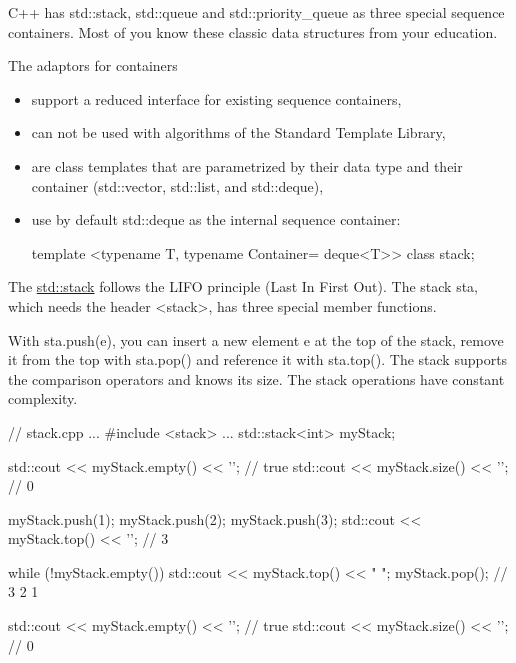 C++ has std::stack, std::queue and std::priority\_queue as three special sequence containers. Most of you know these classic data structures from your education.

The adaptors for containers

\begin{itemize}
\item 
support a reduced interface for existing sequence containers,

\item 
can not be used with algorithms of the Standard Template Library,

\item 
are class templates that are parametrized by their data type and their container (std::vector, std::list, and std::deque),

\item 
use by default std::deque as the internal sequence container:

\begin{cpp}
template <typename T, typename Container= deque<T>>
class stack;
\end{cpp}
\end{itemize}



The \href{http://en.cppreference.com/w/cpp/container/stack}{std::stack} follows the LIFO principle (Last In First Out). The stack sta, which needs the header <stack>, has three special member functions.

With sta.push(e), you can insert a new element e at the top of the stack, remove it from the top with sta.pop() and reference it with sta.top(). The stack supports the comparison operators and knows its size. The stack operations have constant complexity.


\begin{cpp}
// stack.cpp
...
#include <stack>
...
std::stack<int> myStack;

std::cout << myStack.empty() << '\n'; // true
std::cout << myStack.size() << '\n'; // 0

myStack.push(1);
myStack.push(2);
myStack.push(3);
std::cout << myStack.top() << '\n'; // 3

while (!myStack.empty()){
	std::cout << myStack.top() << " ";
	myStack.pop();
} // 3 2 1

std::cout << myStack.empty() << '\n'; // true
std::cout << myStack.size() << '\n'; // 0
\end{cpp}


